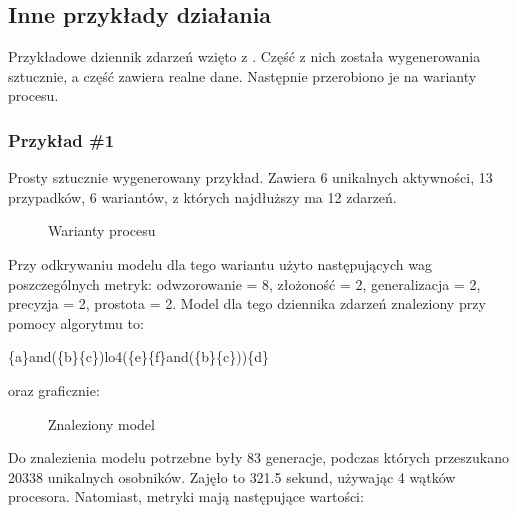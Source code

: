 \subsection{Inne przykłady działania}

Przykładowe dziennik zdarzeń wzięto z \cite{pm-book}. Część z nich została wygenerowania sztucznie, a część zawiera realne dane. Następnie przerobiono je na warianty procesu. 

\subsubsection{Przykład \#1}
Prosty sztucznie wygenerowany przykład. Zawiera 6 unikalnych aktywności, 13 przypadków, 6 wariantów, z których najdłuższy ma 12 zdarzeń. 
\begin{figure}[H]
	\caption{\label{fig:flow_chart}Warianty procesu}
\end{figure}

Przy odkrywaniu modelu dla tego wariantu użyto następujących wag poszczególnych metryk: odwzorowanie = 8, złożoność = 2, generalizacja = 2, precyzja = 2, prostota = 2. Model dla tego dziennika zdarzeń znaleziony przy pomocy algorytmu to:
\begin{center}
	\{a\}and(\{b\}\{c\})lo4(\{e\}\{f\}and(\{b\}\{c\}))\{d\}
\end{center}
oraz graficznie:

\begin{figure}[H]
	\caption{\label{fig:flow_chart}Znaleziony model}
\end{figure}

Do znalezienia modelu potrzebne były 83 generacje, podczas których przeszukano 20338 unikalnych osobników. Zajęło to 321.5 sekund, używając 4 wątków procesora. Natomiast, metryki mają następujące wartości: 

